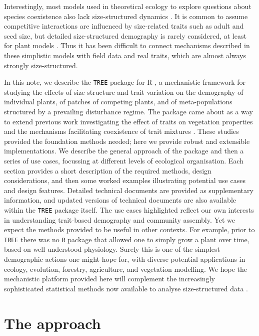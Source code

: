 \documentclass[a4paper,11pt]{article}
\begin{document}
Interestingly, most models used in theoretical ecology to explore
questions about species coexistence also lack size-structured dynamics
\citep[e.g.][]{Calcagno-2006, Geritz-1995, Leimar-2013, Levin-1974,MacArthur-1967,Tilman-1985}.
It is common to assume competitive interactions are influenced by
size-related traits such as adult and seed size, but detailed
size-structured demography is rarely considered, at least for plant
models \cite[for animal examples, see][]{Deroos-1988, Deroos-1992}. Thus it has
been difficult to connect mechanisms described in these simplistic
models with field data and real traits, which are almost always strongly
size-structured.

In this note, we describe the \texttt{TREE} package for R
\citep{R-2015}, a mechanistic framework for studying the effects of size
structure and trait variation on the demography of individual plants, of
patches of competing plants, and of meta-populations structured by a
prevailing disturbance regime. The package came about as a way to extend
previous work investigating the effect of traits on vegetation
properties \citep{Falster-2011} and the mechanisms facilitating
coexistence of trait mixtures \citep{Falster-2015}. These studies
provided the foundation methods needed; here we provide robust and
extensible implementations. We describe the general approach of the
package and then a series of use cases, focussing at different levels of
ecological organisation. Each section provides a short description of
the required methods, design considerations, and then some worked
examples illustrating potential use cases and design features. Detailed
technical documents are provided as supplementary information, and updated
versions of technical documents are also available within the \texttt{TREE}
package itself. The use cases highlighted reflect our own interests in
understanding trait-based demography and community assembly. Yet we
expect the methods provided to be useful in other contexts. For example,
prior to \texttt{TREE} there was no \texttt{R} package that allowed one to simply grow a
plant over time, based on well-understood physiology. Surely this is one
of the simplest demographic actions one might hope for, with diverse
potential applications in ecology, evolution, forestry, agriculture, and
vegetation modelling. We hope the mechanistic platform provided here
will complement the increasingly sophisticated statistical methods now
available to analyse size-structured data \citep[e.g.][]{Metcalf-2013}.

\section{The approach}
\end{document}
